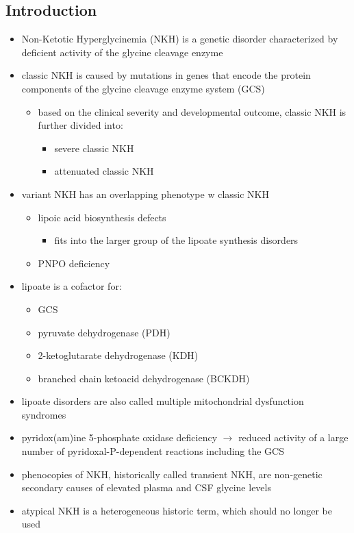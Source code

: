 \documentclass{scrartcl}
\begin{document}
\subsection{Introduction}
\label{sec:org1e8fbd8}
\begin{itemize}
\item Non-Ketotic Hyperglycinemia (NKH) is a genetic disorder characterized
by deficient activity of the glycine cleavage enzyme
\item classic NKH is caused by mutations in genes that encode the protein
components of the glycine cleavage enzyme system (GCS)
\begin{itemize}
\item based on the clinical severity and developmental outcome, classic
NKH is further divided into:
\begin{itemize}
\item severe classic NKH
\item attenuated classic NKH
\end{itemize}
\end{itemize}
\item variant NKH has an overlapping phenotype w classic NKH
\begin{itemize}
\item lipoic acid biosynthesis defects
\begin{itemize}
\item fits into the larger group of the lipoate synthesis
disorders
\end{itemize}
\item PNPO deficiency
\end{itemize}
\item lipoate is a cofactor for:
\begin{itemize}
\item GCS
\item pyruvate dehydrogenase (PDH)
\item 2-ketoglutarate dehydrogenase (KDH)
\item branched chain ketoacid dehydrogenase (BCKDH)
\end{itemize}
\item lipoate disorders are also called multiple mitochondrial dysfunction
syndromes
\item pyridox(am)ine 5-phosphate oxidase deficiency \(\to\) reduced activity
of a large number of pyridoxal-P-dependent reactions including the
GCS
\item phenocopies of NKH, historically called transient NKH, are
non-genetic secondary causes of elevated plasma and CSF glycine
levels
\item atypical NKH is a heterogeneous historic term, which should no
longer be used
\end{itemize}
\end{document}
